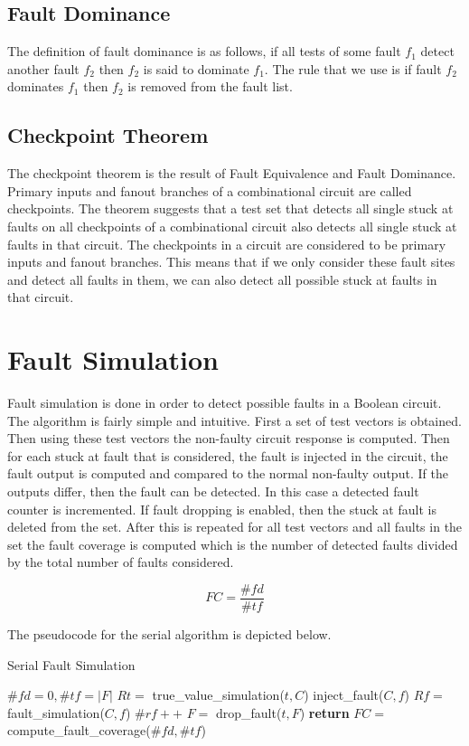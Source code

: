 \documentclass[a4paper,12pt]{article}
\begin{document}
\subsection*{Fault Dominance}
The definition of fault dominance is as follows, if all tests of some fault $f_1$ detect another fault $f_2$ then $f_2$ is said to dominate $f_1$. The rule that we use is if fault $f_2$ dominates $f_1$ then $f_2$ is removed from the fault list.

\subsection*{Checkpoint Theorem}
The checkpoint theorem is the result of Fault Equivalence and Fault Dominance. Primary inputs and fanout branches of a combinational circuit are called checkpoints. The theorem suggests that a test set that detects all single stuck at faults on all checkpoints of a combinational circuit also detects all single stuck at faults in that circuit. The checkpoints in a circuit are considered to be primary inputs and fanout branches. This means that if we only consider these fault sites and detect all faults in them, we can also detect all possible stuck at faults in that circuit.

\section*{Fault Simulation}
Fault simulation is done in order to detect possible faults in a Boolean circuit. The algorithm is fairly simple and intuitive. First a set of test vectors is obtained. Then using these test vectors the non-faulty circuit response is computed. Then for each stuck at fault that is considered, the fault is injected in the circuit, the fault output is computed and compared to the normal non-faulty output. If the outputs differ, then the fault can be detected. In this case a detected fault counter is incremented. If fault dropping is enabled, then the stuck at fault is deleted from the set. After this is repeated for all test vectors and all faults in the set the fault coverage is computed which is the number of detected faults divided by the total number of faults considered. 

$$FC = \frac{\#fd}{\#tf}$$

The pseudocode for the serial algorithm is depicted below.

\begin{algorithm}
	\caption{Serial Fault Simulation} 
	\begin{algorithmic}[1]
		\State $\#fd = 0, \#tf = |F|$
			\State $Rt = $ true\_value\_simulation($t,C$)
					\State inject\_fault($C,f$)
					\State $Rf = $ fault\_simulation($C,f$)
					\State $\#rf++$
					\State $F = $ drop\_fault($t,F$)
				\EndIf	
			\EndFor
		\EndFor
					\State \textbf{return} $FC = $ compute\_fault\_coverage($\#fd,\#tf$)
	\end{algorithmic} 
\end{algorithm}
\end{document}
